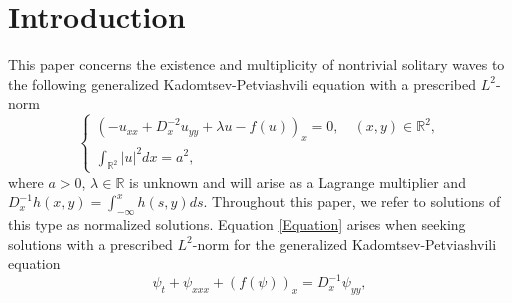\documentclass[11pt]{amsart}
\numberwithin{equation}{section}
\begin{document}
\section{Introduction}
This paper concerns the existence and multiplicity of nontrivial solitary waves to the following
generalized Kadomtsev-Petviashvili equation with a prescribed {$L^2$-norm}
\begin{equation}\label{Equation}
    \left\{\begin{array}{l}
        \left(-u_{x x}+D_x^{-2} u_{y y}+\lambda u-f(u)\right)_x=0,{\quad (x,y) \in \mathbb{R}^2, } \\[10pt]
    \displaystyle   \int_{\mathbb{R}^2}|u|^2 d x=a^2,
    \end{array}\right.%
\end{equation}
where $a>0$, $\lambda \in \mathbb{R}$ is unknown and will arise as a Lagrange multiplier and $D_x^{-1} h(x, y)=\int_{-\infty}^x h(s, y) d s$. Throughout this paper, we refer to solutions of this type as normalized solutions. Equation \eqref{Equation} arises when seeking solutions with a prescribed {$L^2$-norm} for the generalized Kadomtsev-Petviashvili equation
\begin{equation}\label{GKPN=2}
    \psi_t+\psi_{x x x}+(f(\psi))_x=D_x^{-1} \psi_{yy},
\end{equation}
\end{document}
